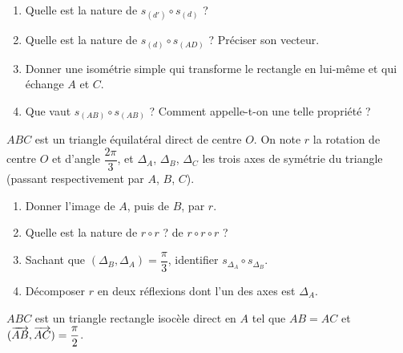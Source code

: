 \begin{enumerate}
	\item Quelle est la nature de $s_{(d')}\circ s_{(d)}$ ?
	\item Quelle est la nature de $s_{(d)}\circ s_{(AD)}$ ? Préciser son
	vecteur.
	\item Donner une isométrie simple qui transforme le rectangle en lui-même
	et qui échange $A$ et $C$.
	\item Que vaut $s_{(AB)}\circ s_{(AB)}$ ? Comment appelle-t-on une telle
	propriété ?
\end{enumerate}

$ABC$ est un triangle équilatéral direct de centre $O$. On note $r$ la
rotation de centre $O$ et d'angle $\dfrac{2\pi}{3}$, et $\Delta_A$, $\Delta_B$,
$\Delta_C$ les trois axes de symétrie du triangle (passant respectivement par
$A$, $B$, $C$).

\begin{center}
\end{center}

\begin{enumerate}
	\item Donner l'image de $A$, puis de $B$, par $r$.
	\item Quelle est la nature de $r\circ r$ ? de $r\circ r\circ r$ ?
	\item Sachant que $(\Delta_B,\Delta_A) = \dfrac{\pi}{3}$, identifier
	$s_{\Delta_A}\circ s_{\Delta_B}$.
	\item Décomposer $r$ en deux réflexions dont l'un des axes est $\Delta_A$.
\end{enumerate}

$ABC$ est un triangle rectangle isocèle direct en $A$ tel que $AB = AC$ et
$(\overrightarrow{AB},\overrightarrow{AC}) = \dfrac{\pi}{2}$.

